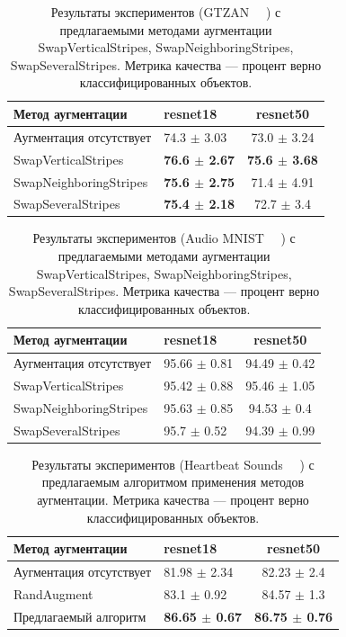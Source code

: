 \documentclass[12pt, fleqn]{article}
\begin{document}
\begin{table}[ht!]
    \centering
	\begin{tabular}{| l | l | c |}
    	\hline
	    Метод аугментации & resnet18 & resnet50 \\ \hline
	    Аугментация отсутствует  & 74.3 $\pm$ 3.03 & 73.0 $\pm$ 3.24 \\ \hline
	    SwapVerticalStripes & \textbf{76.6 $\pm$ 2.67} & \textbf{75.6 $\pm$ 3.68} \\ \hline
	    SwapNeighboringStripes & \textbf{75.6 $\pm$ 2.75} & 71.4 $\pm$ 4.91 \\ \hline
	    SwapSeveralStripes & \textbf{75.4 $\pm$ 2.18} & 72.7 $\pm$ 3.4 \\ \hline
	\end{tabular}
	\caption{Результаты экспериментов (GTZAN ~\cite{GTZAN_Article}~\cite{GTZAN_kaggle}) с предлагаемыми методами аугментации SwapVerticalStripes, SwapNeighboringStripes, SwapSeveralStripes. Метрика качества --- процент верно классифицированных объектов.}
	\label{table:lukianov_pavel_t2}
\end{table}

\begin{table}[ht!]
    \centering
	\begin{tabular}{| l | l | c |}
    	\hline
	    Метод аугментации & resnet18 & resnet50 \\ \hline
	    Аугментация отсутствует  & 95.66 $\pm$ 0.81 & 94.49 $\pm$ 0.42 \\ \hline
	    SwapVerticalStripes & 95.42 $\pm$ 0.88 & 95.46 $\pm$  1.05 \\ \hline
	    SwapNeighboringStripes & 95.63 $\pm$ 0.85 & 94.53 $\pm$ 0.4 \\ \hline
	    SwapSeveralStripes & 95.7 $\pm$ 0.52 & 94.39 $\pm$ 0.99 \\ \hline
	\end{tabular}
	\caption{Результаты экспериментов (Audio MNIST ~\cite{AudioMnistArticle}~\cite{AudioMnistKaggle}) с предлагаемыми методами аугментации SwapVerticalStripes, SwapNeighboringStripes, SwapSeveralStripes. Метрика качества --- процент верно классифицированных объектов.}
	\label{table:lukianov_pavel_t2}
\end{table}

\begin{table}[ht!]
    \centering
	\begin{tabular}{| l | l | c |}
    	\hline
	    Метод аугментации & resnet18 & resnet50 \\ \hline
	    Аугментация отсутствует  & 81.98 $\pm$ 2.34 & 82.23 $\pm$ 2.4 \\ \hline
	    RandAugment ~\cite{RandAugment} & 83.1 $\pm$ 0.92 & 84.57 $\pm$ 1.3 \\ \hline
	    Предлагаемый алгоритм & \textbf{86.65 $\pm$ 0.67} & \textbf{86.75 $\pm$ 0.76} \\ \hline
	\end{tabular}
	\caption{Результаты экспериментов (Heartbeat Sounds ~\cite{HeartbeatSoundsArticle}~\cite{HeartbeatSoundsKaggle}) с предлагаемым алгоритмом применения методов аугментации. Метрика качества --- процент верно классифицированных объектов.}
	\label{table:lukianov_pavel_t3}
\end{table}
\end{document}
